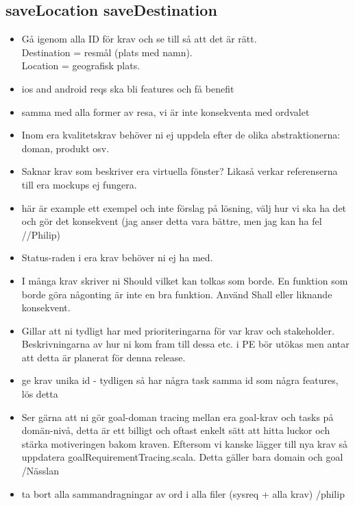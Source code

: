 \documentclass[a4paper]{article}
\begin{document}
\subsection{saveLocation saveDestination}
		\begin{itemize}
			\item Gå igenom alla ID för krav och se till så att det är rätt.
			\\Destination = resmål (plats med namn).
			\\Location = geografisk plats.
		\end{itemize}
	\begin{itemize}	
	\item ios and android reqs ska bli features och få benefit
	\item samma med alla former av resa, vi är inte konsekventa med ordvalet
	\item Inom era kvalitetskrav behöver ni ej uppdela efter de olika abstraktionerna: doman, produkt osv.
	\item Saknar krav som beskriver era virtuella fönster? Likaså verkar referenserna till era mockups ej fungera.
	
	\item här är example ett exempel och inte förslag på lösning, välj hur vi ska ha det och gör det konsekvent (jag anser detta vara bättre, men jag kan ha fel //Philip)
	
	\item Status-raden i era krav behöver ni ej ha med.
	\item I många krav skriver ni Should vilket kan tolkas som borde. En funktion som borde göra någonting är inte en bra funktion. Använd Shall eller liknande konsekvent. 
	\item Gillar att ni tydligt har med prioriteringarna för var krav och stakeholder. Beskrivningarna av hur ni kom fram till dessa etc. i PE bör utökas men antar att detta är planerat för denna release.
	\item ge krav unika id - tydligen så har några task samma id som några features, lös detta
	\item Ser gärna att ni gör goal-doman tracing mellan era goal-krav och tasks på domän-nivå, detta är ett billigt och oftast enkelt sätt att hitta luckor och stärka motiveringen bakom kraven. Eftersom vi kanske lägger till nya krav så uppdatera goalRequirementTracing.scala. Detta gäller bara domain och goal /Nässlan
	\item ta bort alla sammandragningar av ord i alla filer (sysreq + alla krav)	/philip
	\end{itemize}
\end{document}
